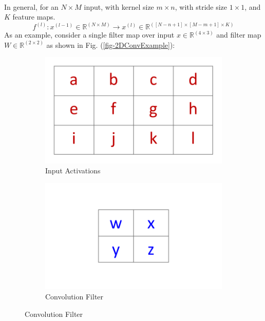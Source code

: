 \documentclass[12pt,letterpaper]{article}
\begin{document}
\paragraph*{}In general, for an $N \times M$ input, with kernel size $m \times n$, with stride size $1 \times 1$, and $K$ feature maps.
\begin{equation}
f^{(l)} : x^{(l-1)} \in \mathbb{R}^{(N \times M)} \rightarrow
x^{(l)} \in \mathbb{R}^{([N-n+1] \times [M-m+1] \times K)}
\end{equation}
As an example, consider a single filter map over input $x \in \mathbb{R}^{(4 \times 3)}$ and filter map $W \in \mathbb{R}^{(2 \times 2)}$ as shown in Fig. (\ref{fig-2DConvExample}):
\begin{figure}[H]
\begin{center}

	\begin{subfigure}{0.45\textwidth}
	\includegraphics[scale=0.6]{../figures/2DConvExample(a)}
	\caption{Input Activations}
	\end{subfigure}
	
	\begin{subfigure}{0.45\textwidth}
	\includegraphics[scale=0.6]{../figures/2DConvExample(b)}
	\caption{Convolution Filter}
	\end{subfigure}
	

\end{center}
\end{figure}
\end{document}
